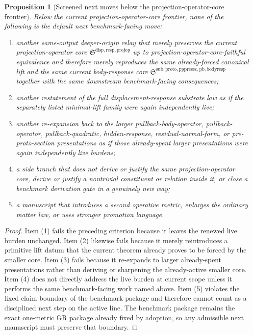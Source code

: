 \documentclass[11pt]{article}
\newcommand{\ProjectionOperatorCore}{\mathfrak S^{\mathrm{disp,resp,projop}}}
\newcommand{\PullbackBodyResponseCore}{\mathfrak S^{\mathrm{sub,proto,pppresec,pb,bodyresp}}}
\newtheorem{proposition}{Proposition}
\begin{document}
\begin{proposition}[Screened next moves below the projection-operator-core frontier]
Below the current projection-operator-core frontier, none of the following is the default next benchmark-facing move:
\begin{enumerate}
    \item another same-output deeper-origin relay that merely preserves the current projection-operator core \(\ProjectionOperatorCore\) up to projection-operator-core-faithful equivalence and therefore merely reproduces the same already-forced canonical lift and the same current body-response core \(\PullbackBodyResponseCore\) together with the same downstream benchmark-facing consequences;
    \item another restatement of the full displacement-response substrate law as if the separately listed minimal-lift family were again independently live;
    \item another re-expansion back to the larger pullback-body-operator, pullback-operator, pullback-quadratic, hidden-response, residual-normal-form, or pre-proto-section presentations as if those already-spent larger presentations were again independently live burdens;
    \item a side branch that does not derive or justify the same projection-operator core, derive or justify a nontrivial constituent or relation inside it, or close a benchmark derivation gate in a genuinely new way;
    \item a manuscript that introduces a second operative metric, enlarges the ordinary matter law, or uses stronger promotion language.
\end{enumerate}
\end{proposition}

\begin{proof}
Item (1) fails the preceding criterion because it leaves the renewed live burden unchanged. Item (2) likewise fails because it merely reintroduces a primitive lift datum that the current theorem already proves to be forced by the smaller core. Item (3) fails because it re-expands to larger already-spent presentations rather than deriving or sharpening the already-active smaller core. Item (4) does not directly address the live burden at current scope unless it performs the same benchmark-facing work named above. Item (5) violates the fixed claim boundary of the benchmark package and therefore cannot count as a disciplined next step on the active line. The benchmark package remains the exact one-metric GR package already fixed by adoption, so any admissible next manuscript must preserve that boundary.
\end{proof}
\end{document}

